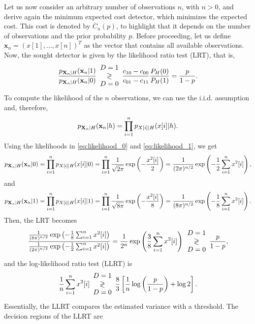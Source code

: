 Let us now consider an arbitrary number of observations $n$, with $n >0$, and derive again the minimum expected cost detector, which minimizes the expected cost. This cost is denoted by $\overline{C}_n(p)$, to highlight that it depends on the number of observations and the prior probability $p$. Before proceeding, let us define $\mathbf{x}_n = (x[1], \ldots, x[n])^T$ as the vector that contains all available observations. Now, the sought detector is given by the likelihood ratio test (LRT), that is,
\begin{equation*}
	\frac{p_{{\bf X}_n|H}({\bf x}_n|1)}{p_{{\bf X}_n|H}({\bf x}_n|0)}\begin{array}{c} D=1 \\ \gtrless \\ D=0 \end{array} \frac{c_{10}-c_{00}}{c_{01}-c_{11}} \frac{P_H(0)}{P_H(1)} = \frac{p}{1 - p}.
\end{equation*}
To compute the likelihood of the $n$ observations, we can use the i.i.d. assumption and, therefore,
\begin{equation*}
	p_{{\bf X}_n|H}({\bf x}_n|h) = \prod_{i = 1}^{n} p_{X[i]|H}( x[i] | h).
\end{equation*}
Using the likelihoods in \eqref{eq:likelihood_0} and \eqref{eq:likelihood_1}, we get
\begin{equation*}
	p_{{\bf X}_n|H}({\bf x}_n|0) = \prod_{i = 1}^{n} p_{X[i]|H}( x[i] | 0) = \prod_{i = 1}^{n} \frac{1}{\sqrt{2 \pi}} \exp \left(-\frac{x^2[i]}{2}\right) = \frac{1}{(2 \pi)^{n/2}} \exp \left(-\frac{1}{2} \sum_{i = 1}^{n} x^2[i]\right),
\end{equation*}
and
\begin{equation*}
	p_{{\bf X}_n|H}({\bf x}_n|1) = \prod_{i = 1}^{n} p_{X[i]|H}( x[i] | 1) = \prod_{i = 1}^{n} \frac{1}{\sqrt{8 \pi}} \exp \left(-\frac{x^2[i]}{8}\right) = \frac{1}{(8 \pi)^{n/2}} \exp \left(-\frac{1}{8} \sum_{i = 1}^{n} x^2[i]\right).
\end{equation*}
Then, the LRT becomes
\begin{equation*}
	\frac{\frac{1}{(8 \pi)^{n/2}} \exp \left(-\frac{1}{8} \sum_{i = 1}^{n} x^2[i]\right)}{\frac{1}{(2 \pi)^{n/2}} \exp \left(-\frac{1}{2} \sum_{i = 1}^{n} x^2[i]\right)} = \frac{1}{2^{n}} \exp \left(\frac{3 }{8} \sum_{i = 1}^{n} x^2[i]\right) \begin{array}{c} D=1 \\ \gtrless \\ D=0 \end{array} \frac{p}{1 - p},
\end{equation*}
and the log-likelihood ratio test (LLRT) is
\begin{equation*}
  \frac{1}{n} \sum_{i = 1}^{n} x^2[i] \begin{array}{c} D=1 \\ \gtrless \\ D=0 \end{array} \frac{8}{3} \left[\frac{1}{n} \log \left(\frac{p}{1 - p}  \right) + \log 2 \right].
\end{equation*}
Essentially, the LLRT compares the estimated variance with a threshold. The decision regions of the LLRT are
